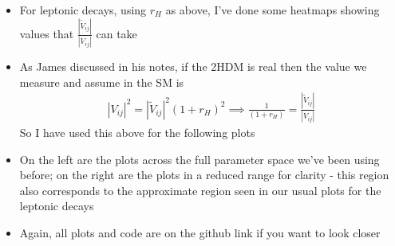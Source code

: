 \documentclass[11pt]{article}
\newcommand{\tVV}{\frac{|\tilde{V}_{ij}|}{|V_{ij}|}}
\begin{document}
\newpage
\begin{itemize}
    \item For leptonic decays, using $r_H$ as above, I've done some heatmaps showing values that $\tVV$ can take
    \item As James discussed in his notes, if the 2HDM is real then the value we measure and assume in the SM is
        \begin{align*}
            |V_{ij}|^2 = |\tilde{V}_{ij}|^2(1+r_H)^2 \implies \frac{1}{(1+r_H)} = \tVV
        \end{align*}
        So I have used this above for the following plots
    \item On the left are the plots across the full parameter space we've been using before; on the right are the plots in a reduced range for clarity - this region also corresponds to the approximate region seen in our usual plots for the leptonic decays
    \item Again, all plots and code are on the github link if you want to look closer
\end{itemize}
\end{document}
